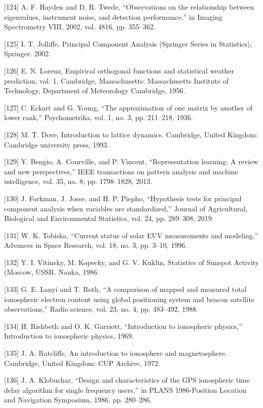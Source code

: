 \documentclass[sn-mathphys-num]{sn-jnl}%
\begin{document}
[124] A. F. Hayden and D. R. Twede, “Observations on the relationship between eigenvalues, instrument noise, and detection performance,” in Imaging Spectrometry VIII, 2002, vol. 4816, pp. 355–362.

[125] I. T. Jolliffe, Principal Component Analysis (Springer Series in Statistics), Springer. 2002.

[126] E. N. Lorenz, Empirical orthogonal functions and statistical weather prediction, vol. 1. Cambridge, Massachusetts: Massachusetts Institute of Technology, Department of Meteorology Cambridge, 1956.

[127] C. Eckart and G. Young, “The approximation of one matrix by another of lower rank,” Psychometrika, vol. 1, no. 3, pp. 211–218, 1936.

[128] M. T. Dove, Introduction to lattice dynamics. Cambridge, United Kingdom: Cambridge university press, 1993.

[129] Y. Bengio, A. Courville, and P. Vincent, “Representation learning: A review and new perspectives,” IEEE transactions on pattern analysis and machine intelligence, vol. 35, no. 8, pp. 1798–1828, 2013.

[130] J. Forkman, J. Josse, and H. P. Piepho, “Hypothesis tests for principal component analysis when variables are standardized,” Journal of Agricultural, Biological and Environmental Statistics, vol. 24, pp. 289–308, 2019.

[131] W. K. Tobiska, “Current status of solar EUV measurements and modeling,” Advances in Space Research, vol. 18, no. 3, pp. 3–10, 1996.

[132] Y. I. Vitinsky, M. Kopecky, and G. V. Kuklin, Statistics of Sunspot Activity (Moscow, USSR. Nauka, 1986.

[133] G. E. Lanyi and T. Roth, “A comparison of mapped and measured total ionospheric electron content using global positioning system and beacon satellite observations,” Radio science, vol. 23, no. 4, pp. 483–492, 1988.

[134] H. Rishbeth and O. K. Garriott, “Introduction to ionospheric physics,” Introduction to ionospheric physics, 1969.

[135] J. A. Ratcliffe, An introduction to ionosphere and magnetosphere. Cambridge, United Kingdom: CUP Archive, 1972.

[136] J. A. Klobuchar, “Design and characteristics of the GPS ionospheric time delay algorithm for single frequency users,” in PLANS 1986-Position Location and Navigation Symposium, 1986, pp. 280–286.
\end{document}
